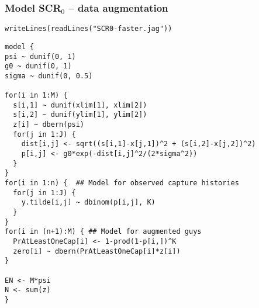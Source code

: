 \documentclass[color=usenames,dvipsnames]{beamer}\usepackage[]{graphicx}\usepackage[]{color}
\makeatletter
\newcommand{\hlstr}[1]{\textcolor[rgb]{0.749,0.012,0.012}{#1}}%
\newcommand{\hlstd}[1]{\textcolor[rgb]{0,0,0}{#1}}%
\newcommand{\hlkwd}[1]{\textcolor[rgb]{0.004,0.004,0.506}{#1}}%
\newenvironment{kframe}{%
 \def\at@end@of@kframe{}%
 \ifinner\ifhmode%
  \def\at@end@of@kframe{\end{minipage}}%
  \begin{minipage}{\columnwidth}%
 \fi\fi%
 \def\FrameCommand##1{\hskip\@totalleftmargin \hskip-\fboxsep
 \colorbox{shadecolor}{##1}\hskip-\fboxsep
     \hskip-\linewidth \hskip-\@totalleftmargin \hskip\columnwidth}%
 \MakeFramed {\advance\hsize-\width
   \@totalleftmargin\z@ \linewidth\hsize
   \@setminipage}}%
 {\par\unskip\endMakeFramed%
 \at@end@of@kframe}
\newenvironment{knitrout}{}{} %
\makeatother
\begin{document}
\begin{frame}[fragile]
  \frametitle{Model SCR$_0$ -- data augmentation}
\vspace{-3pt}
\begin{knitrout}\tiny
{}\color{fgcolor}\begin{kframe}
\begin{alltt}
\hlkwd{writeLines}\hlstd{(}\hlkwd{readLines}\hlstd{(}\hlstr{"SCR0-faster.jag"}\hlstd{))}
\end{alltt}
\begin{verbatim}
model {
psi ~ dunif(0, 1)
g0 ~ dunif(0, 1)
sigma ~ dunif(0, 0.5)

for(i in 1:M) {
  s[i,1] ~ dunif(xlim[1], xlim[2])
  s[i,2] ~ dunif(ylim[1], ylim[2])
  z[i] ~ dbern(psi)
  for(j in 1:J) {
    dist[i,j] <- sqrt((s[i,1]-x[j,1])^2 + (s[i,2]-x[j,2])^2)
    p[i,j] <- g0*exp(-dist[i,j]^2/(2*sigma^2))
  }
}
for(i in 1:n) {  ## Model for observed capture histories
  for(j in 1:J) {
    y.tilde[i,j] ~ dbinom(p[i,j], K)
  }
}
for(i in (n+1):M) { ## Model for augmented guys
  PrAtLeastOneCap[i] <- 1-prod(1-p[i,])^K
  zero[i] ~ dbern(PrAtLeastOneCap[i]*z[i])
}

EN <- M*psi
N <- sum(z)
}
\end{verbatim}
\end{kframe}
\end{knitrout}
\end{frame}
\end{document}

